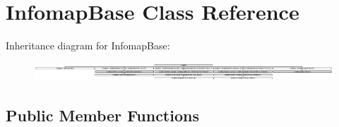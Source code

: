 \hypertarget{classInfomapBase}{}\section{Infomap\+Base Class Reference}
\label{classInfomapBase}
Inheritance diagram for Infomap\+Base\+:\begin{figure}[H]
\begin{center}
\leavevmode
\includegraphics[height=0.693928cm]{classInfomapBase}
\end{center}
\end{figure}
\subsection*{Public Member Functions}
